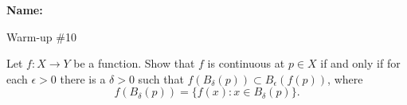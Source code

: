 \documentclass[12pt]{article}
\begin{document}
\noindent \textbf{Name:} 

\begin{center}
Warm-up \#10
\end{center}

\noindent Let $f : X \to Y$ be a function. Show that $f$ is continuous at $p \in X$ if and only if for each $\epsilon > 0$ there is a $\delta > 0$ such that $f(B_\delta(p)) \subset B_\epsilon(f(p))$, where 
\[
f(B_\delta(p)) = \{f(x) : x \in B_\delta(p)\}.
\]
\end{document}
